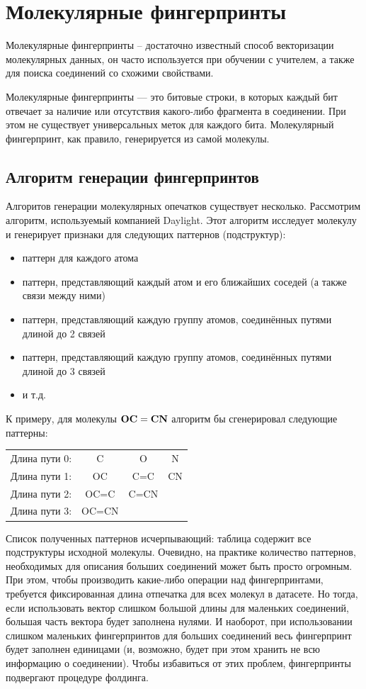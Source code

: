 \documentclass[a4paper,14pt]{extreport}
\begin{document}
  \chapter{Молекулярные фингерпринты}
  \label{c:fingerprints}
  Молекулярные фингерпринты – достаточно известный способ векторизации молекулярных данных, он часто используется при обучении с учителем, а также для поиска соединений со схожими свойствами.
  
Молекулярные фингерпринты — это битовые строки, в которых каждый бит отвечает за наличие или отсутствия какого-либо фрагмента в соединении. При этом не существует универсальных меток для каждого бита. Молекулярный фингерпринт, как правило, генерируется из самой молекулы. 

  \section{Алгоритм генерации фингерпринтов}
  \label{s:fp_generation_sec}
  Алгоритов генерации молекулярных опечатков существует несколько. Рассмотрим алгоритм, используемый компанией Daylight. Этот алгоритм исследует молекулу и генерирует признаки для следующих паттернов (подструктур):
  \begin{itemize}
	\item паттерн для каждого атома
	\item паттерн, представляющий каждый атом и его ближайших соседей (а также связи между ними)
	\item паттерн, представляющий каждую группу атомов, соединённых путями длиной до 2 связей
	\item паттерн, представляющий каждую группу атомов, соединённых путями длиной до 3 связей
	\item и т.д.
  \end{itemize}
К примеру, для молекулы $\bold{OC=CN}$ алгоритм бы сгенерировал следующие паттерны:


\begin{center}
\begin{tabular}{cccc}
	Длина пути 0: & C & O & N\\
	Длина пути 1: & OC & C=C & CN\\
	Длина пути 2: & OC=C & C=CN\\
	Длина пути 3: & OC=CN
\end{tabular}
\end{center}


Список полученных паттернов исчерпывающий: таблица содержит все подструктуры исходной молекулы. Очевидно, на практике количество паттернов, необходимых для описания больших соединений может быть просто огромным. При этом, чтобы производить какие-либо операции над фингерпринтами, требуется фиксированная длина отпечатка для всех молекул в датасете. Но тогда, если использовать вектор слишком большой длины для маленьких соединений, большая часть вектора будет заполнена нулями. И наоборот, при использовании слишком маленьких фингерпринтов для больших соединений весь фингерпринт будет заполнен единицами (и, возможно, будет при этом хранить не всю информацию о соединении). Чтобы избавиться от этих проблем, фингерпринты подвергают процедуре фолдинга.
\end{document}
